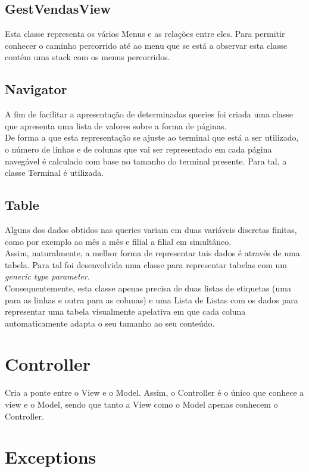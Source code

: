 \documentclass[a4paper]{report}
\begin{document}
\subsection{GestVendasView}

Esta classe representa os vários Menus e as relações entre eles. Para permitir
conhecer o caminho percorrido até ao menu que se está a observar esta classe
contém uma stack com os menus percorridos.

\subsection{Navigator}

A fim de facilitar a apresentação de determinadas queries foi criada uma classe que apresenta uma
lista de valores sobre a forma de páginas.\\
De forma a que esta representação se ajuste ao terminal que está a ser utilizado, o número de linhas
e de colunas que vai ser representado em cada página navegável é calculado com base no tamanho do
terminal presente. Para tal, a classe Terminal é utilizada.

\subsection{Table}

Alguns dos dados obtidos nas queries variam em duas variáveis discretas finitas, como por exemplo
ao mês a mês e filial a filial em simultâneo.\\
Assim, naturalmente, a melhor forma de representar tais dados é através de uma tabela.
Para tal foi desenvolvida uma classe para representar tabelas com um \textit{generic type parameter}.\\
Consequentemente, esta classe apenas precisa de duas listas de etiquetas (uma para as linhas e
outra para as colunas) e uma Lista de Listas com os dados para representar uma tabela visualmente
apelativa em que cada coluna automaticamente adapta o seu tamanho ao seu conteúdo.

\section{Controller}

Cria a ponte entre o View e o Model. Assim, o Controller é o único que conhece a view e o
Model, sendo que tanto a View como o Model apenas conhecem o Controller.

\section{Exceptions}
\end{document}
